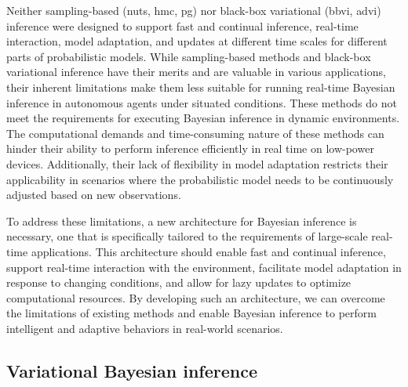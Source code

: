 Neither sampling-based (\ac{nuts}, \ac{hmc}, \ac{pg}) nor black-box variational (\ac{bbvi}, \ac{advi}) inference were designed to support fast and continual inference, real-time interaction, model adaptation, and updates at different time scales for different parts of probabilistic models.
While sampling-based methods and black-box variational inference have their merits and are
valuable in various applications, their inherent limitations make them less suitable for running real-time Bayesian inference in autonomous agents under situated conditions.
These methods do not meet the requirements for executing Bayesian inference in dynamic
environments.
The computational demands and time-consuming nature of these methods can hinder their ability
to perform inference efficiently in real time on low-power devices.
Additionally, their lack of flexibility in model adaptation restricts their applicability in
scenarios where the probabilistic model needs to be continuously adjusted based on new
observations.

To address these limitations, a new architecture for Bayesian inference is necessary, one that
is specifically tailored to the requirements of large-scale real-time applications.
This architecture should enable fast and continual inference, support real-time interaction
with the environment, facilitate model adaptation in response to changing conditions, and
allow for lazy updates to optimize computational resources.
By developing such an architecture, we can overcome the limitations of existing methods and
enable Bayesian inference to perform intelligent and adaptive behaviors in real-world
scenarios.

\subsection{Variational Bayesian inference}


